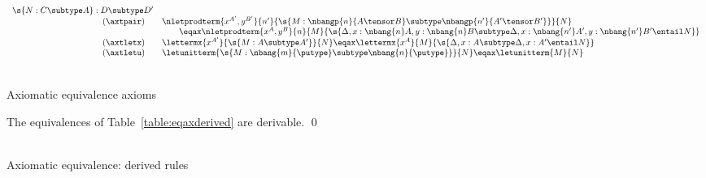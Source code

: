 \documentclass{llncs}
\def\tablenl{\\[0ex]}
\newcommand{\mycaption}[1]{\caption{#1}\vspace{-5ex}}
\begin{document}
\begin{table*}[t]
{\begin{minipage}{\textwidth}
\[\begin{array}{rl}
{    \s{N:C\subtype A}:D\subtype D'}
  \\
  (\axtpair)\quad&\nletprodterm{x^{A'},y^{B'}}{n'}{\s{M : 
      \nbangp{n}{A\tensor B}\subtype \nbangp{n'}{A'\tensor B'}}}{N}\\
  &\qquad\eqax \nletprodterm{x^A,y^B}{n}{M}{
    \s{\Delta,x:\nbang{n}A,y:\nbang{n}B\subtype \Delta,x:\nbang{n'}A',
      y:\nbang{n'}B'\entail N}
  }
  \\
  (\axtletx)\quad&\lettermx{x^{A'}}{\s{M:A\subtype A'}}{N}
  \eqax \lettermx{x^A}{M}{\s{\Delta,x:A\subtype \Delta,x:A'\entail N}}
  \\
  (\axtletu)\quad&\letunitterm{\s{M:\nbang{m}{\putype}\subtype
      \nbang{n}{\putype}}}{N}
  \eqax \letunitterm{M}{N}
\end{array}
\]
\end{minipage}}
\tablenl
\mycaption{Axiomatic equivalence axioms}
\label{table:eqaxrules}
\end{table*}




\begin{lemma}
  The equivalences of
  Table~\ref{table:eqaxderived} are 
  derivable. \qed
\end{lemma}


\begin{table*}[t]
\tablenl
\mycaption{Axiomatic equivalence: derived rules}
\label{table:eqaxderived}
\end{table*}
\end{document}
